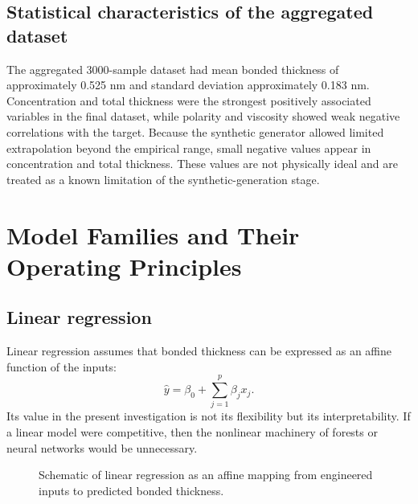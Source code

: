 \documentclass[11pt]{article}
\begin{document}
\subsection{Statistical characteristics of the aggregated dataset}
The aggregated 3000-sample dataset had mean bonded thickness of approximately 0.525 nm and standard deviation approximately 0.183 nm.  Concentration and total thickness were the strongest positively associated variables in the final dataset, while polarity and viscosity showed weak negative correlations with the target. Because the synthetic generator allowed limited extrapolation beyond the empirical range, small negative values appear in concentration and total thickness. These values are not physically ideal and are treated as a known limitation of the synthetic-generation stage.

\section{Model Families and Their Operating Principles}

\subsection{Linear regression}
Linear regression assumes that bonded thickness can be expressed as an affine function of the inputs:
\begin{equation}
\hat{y} = \beta_0 + \sum_{j=1}^{p}\beta_j x_j.
\end{equation}
Its value in the present investigation is not its flexibility but its interpretability. If a linear model were competitive, then the nonlinear machinery of forests or neural networks would be unnecessary.

\begin{figure}[H]
\centering
{}
\caption{Schematic of linear regression as an affine mapping from engineered inputs to predicted bonded thickness.}
\end{figure}
\end{document}
